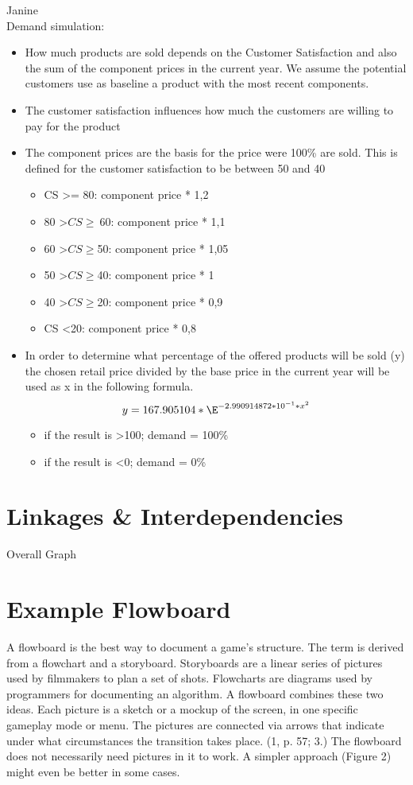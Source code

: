 \documentclass[11pt,titlepage,oneside,openany]{book}
\begin{document}
Janine \\
Demand simulation: 
\begin{itemize}
\item How much products are sold depends on the Customer Satisfaction and also the sum of the component prices in the current year. We assume the potential customers use as baseline a product with the most recent components. 
\item The customer satisfaction influences how much the customers are willing to pay for the product 
\item The component prices are the basis for the price were 100\% are sold. This is defined for the customer satisfaction to be between 50 and 40
\begin{itemize}
\item CS >= 80: component price * 1,2 
\item 80 \textgreater $CS \geq \ $60: component price * 1,1
\item 60 \textgreater $CS \geq $50: component price * 1,05
\item 50 \textgreater $CS \geq $40: component price * 1
\item 40 \textgreater $CS \geq $20: component price * 0,9
\item CS \textless 20: component price * 0,8
\end{itemize}
\item In order to determine what percentage of the offered products will be sold (y) the chosen retail price divided by the base price in the current year will be used as x in the following formula.
\begin{equation}
y = 167.905104 * \E^{ -2.990914872 * 10^{ -1 } * x^{ 2 }}
\end{equation}
\begin{itemize}
    \item if the result is \textgreater 100; demand = 100\%
    \item if the result is \textless 0; demand = 0\%
\end{itemize}
\end{itemize}

\section{Linkages \& Interdependencies}
\label{sec:link}
Overall Graph

\section{Example Flowboard}
A flowboard is the best way to document a game’s structure. The term is derived
from a flowchart and a storyboard. Storyboards are a linear series of pictures
used by filmmakers to plan a set of shots. Flowcharts are diagrams used
by programmers for documenting an algorithm. A flowboard combines these
two ideas. Each picture is a sketch or a mockup of the screen, in one specific
gameplay mode or menu. The pictures are connected via arrows that indicate
under what circumstances the transition takes place. (1, p. 57; 3.) The flowboard
does not necessarily need pictures in it to work. A simpler approach (Figure
2) might even be better in some cases.
\end{document}
